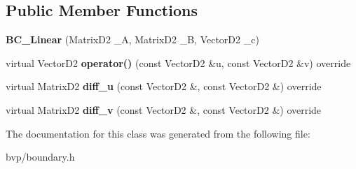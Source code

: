 \subsection*{Public Member Functions}
\begin{DoxyCompactItemize}
\item 
\mbox{\label{classBC__Linear_aaf6acbb563402c281a76c7809c5a9a8e}} 
{\bfseries B\+C\+\_\+\+Linear} (Matrix\+D2 \+\_\+A, Matrix\+D2 \+\_\+B, Vector\+D2 \+\_\+c)
\item 
\mbox{\label{classBC__Linear_a025c57de07ed39bafb89c55733b64642}} 
virtual Vector\+D2 {\bfseries operator()} (const Vector\+D2 \&u, const Vector\+D2 \&v) override
\item 
\mbox{\label{classBC__Linear_a45d6876383349739f7751f1f8d77603a}} 
virtual Matrix\+D2 {\bfseries diff\+\_\+u} (const Vector\+D2 \&, const Vector\+D2 \&) override
\item 
\mbox{\label{classBC__Linear_a2f2ac8714334063e99ab33a1790a593a}} 
virtual Matrix\+D2 {\bfseries diff\+\_\+v} (const Vector\+D2 \&, const Vector\+D2 \&) override
\end{DoxyCompactItemize}


The documentation for this class was generated from the following file\+:\begin{DoxyCompactItemize}
\item 
bvp/boundary.\+h\end{DoxyCompactItemize}
